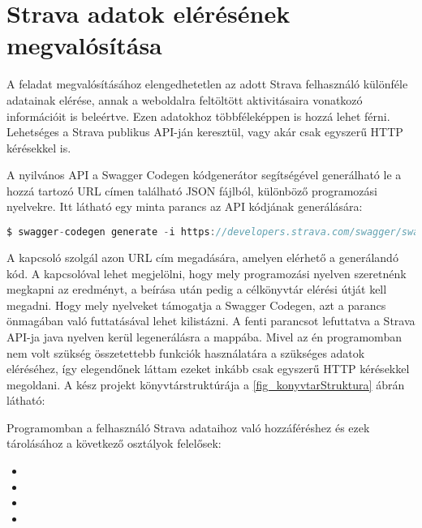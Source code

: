 \section{Strava adatok elérésének megvalósítása}

A feladat megvalósításához elengedhetetlen az adott Strava felhasználó különféle adatainak elérése, annak a weboldalra feltöltött aktivitásaira vonatkozó információit is beleértve.
Ezen adatokhoz többféleképpen is hozzá lehet férni.
Lehetséges a Strava publikus API-ján keresztül, vagy akár csak egyszerű HTTP kérésekkel is. 

A nyilvános API a Swagger Codegen kódgenerátor segítségével generálható le a hozzá tartozó URL címen található JSON fájlból, különböző programozási nyelvekre.\cite{strava}
Itt látható egy minta parancs az API kódjának generálására: 

\begin{lstlisting}[language=Java]
$ swagger-codegen generate -i https://developers.strava.com/swagger/swagger.json -l java -o generated/java 
\end{lstlisting}

A  kapcsoló szolgál azon URL cím megadására, amelyen elérhető a generálandó kód.
A  kapcsolóval lehet megjelölni, hogy mely programozási nyelven szeretnénk megkapni az eredményt, a  beírása után pedig a célkönyvtár elérési útját kell megadni.
Hogy mely nyelveket támogatja a Swagger Codegen, azt a  parancs önmagában való futtatásával lehet kilistázni.
A fenti parancsot lefuttatva a Strava API-ja java nyelven kerül legenerálásra a  mappába.
Mivel az én programomban nem volt szükség összetettebb funkciók használatára a szükséges adatok eléréséhez, így elegendőnek láttam ezeket inkább csak egyszerű HTTP kérésekkel megoldani.
A kész projekt könyvtárstruktúrája a \ref{fig_konyvtarStruktura} ábrán látható: 



Programomban a felhasználó Strava adataihoz való hozzáféréshez és ezek tárolásához a következő osztályok felelősek: 

\begin{itemize}
\setlength\itemsep{0em}
\item {}
\item {}
\item {}
\item {}
\end{itemize}
 

